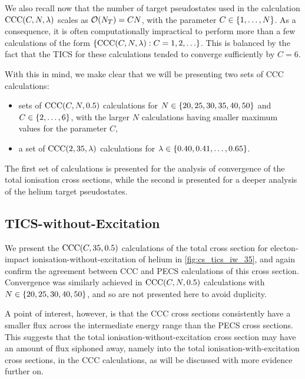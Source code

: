 \documentclass[]{article}
\begin{document}
We also recall now that the number of target pseudostates used in the
calculation $\mathrm{CCC}(C, N, \lambda)$ scales as
$\mathcal{O}(N_{T}) = C N$, with the parameter $C \in \lbrace1, \dotsc, N\rbrace$.
As a consequence, it is often computationally impractical to perform more than a
few calculations of the form
$\lrset{\mathrm{CCC}\lr{C, N, \lambda} : C = 1, 2, \dotsc}$.
This is balanced by the fact that the TICS for these calculations tended to
converge sufficiently by $C = 6$.

With this in mind, we make clear that we will be presenting two sets of CCC
calculations:
\begin{itemize}
\item
  sets of $\mathrm{CCC}(C, N, 0.5)$ calculations for
  $N \in \lbrace20, 25, 30, 35, 40, 50\rbrace$ and $C \in \lbrace2, \dotsc, 6\rbrace$,
  with the larger $N$ calculations having smaller maximum values for the
  parameter $C$,
\item
  a set of $\mathrm{CCC}(2, 35, \lambda)$ calculations for
  $\lambda \in \lbrace0.40, 0.41, \dotsc, 0.65\rbrace$.
\end{itemize}
The first set of calculations is presented for the analysis of convergence of
the total ionisation cross sections, while the second is presented for a deeper
analysis of the helium target pseudostates.

\clearpage

\subsection{TICS-without-Excitation}
\label{sec:re-tics-iw}

We present the $\mathrm{CCC}(C, 35, 0.5)$ calculations of the
total cross section for electon-impact ionisation-without-excitation of helium
in \autoref{fig:cs_tics_iw_35}, and again confirm
\cite{PhysRevA.63.040702, PhysRevA.81.022716} the agreement between CCC and PECS
calculations of this cross section.
Convergence was similarly achieved in $\mathrm{CCC}(C, N, 0.5)$ calculations
with $N \in \lbrace20, 25, 30, 40, 50\rbrace$, and so are not presented here to avoid
duplicity.

A point of interest, however, is that the CCC cross sections consistently
have a smaller flux across the intermediate energy range than the PECS cross
sections.
This suggests that the total ionisation-without-excitation cross section may
have an amount of flux siphoned away, namely into the total
ionisation-with-excitation cross sections, in the CCC calculations, as will be
discussed with more evidence further on.
\end{document}
